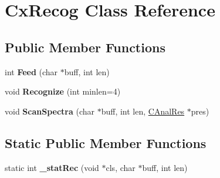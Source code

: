 \hypertarget{class_cx_recog}{\section{Cx\-Recog Class Reference}
\label{class_cx_recog}
}
\subsection*{Public Member Functions}
\begin{DoxyCompactItemize}
\item 
\hypertarget{class_cx_recog_a8bf20bbfd36448913377827b0f537c62}{int {\bfseries Feed} (char $\ast$buff, int len)}\label{class_cx_recog_a8bf20bbfd36448913377827b0f537c62}

\item 
\hypertarget{class_cx_recog_ac5557f49fd835d1b98c6c5c4769aa005}{void {\bfseries Recognize} (int minlen=4)}\label{class_cx_recog_ac5557f49fd835d1b98c6c5c4769aa005}

\item 
\hypertarget{class_cx_recog_a69d4c56bf7b318560b29153fcbfa8637}{void {\bfseries Scan\-Spectra} (char $\ast$buff, int len, \hyperlink{class_c_anal_res}{C\-Anal\-Res} $\ast$pres)}\label{class_cx_recog_a69d4c56bf7b318560b29153fcbfa8637}

\end{DoxyCompactItemize}
\subsection*{Static Public Member Functions}
\begin{DoxyCompactItemize}
\item 
\hypertarget{class_cx_recog_a25da7f99edf75abe33a3144c9558b80d}{static int {\bfseries \-\_\-stat\-Rec} (void $\ast$cls, char $\ast$buff, int len)}\label{class_cx_recog_a25da7f99edf75abe33a3144c9558b80d}

\end{DoxyCompactItemize}

